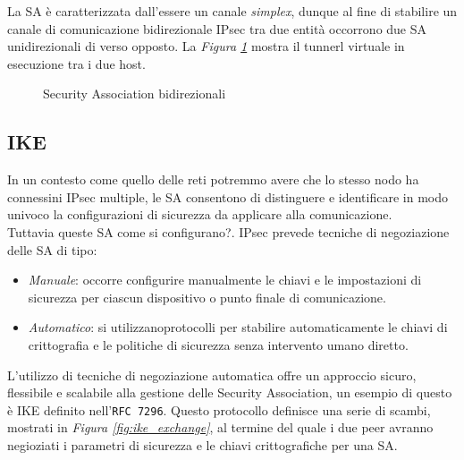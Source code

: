 \noindent
La SA è caratterizzata dall'essere un canale \textit{simplex}, dunque al fine di stabilire un canale di comunicazione bidirezionale IPsec tra due entità occorrono due SA unidirezionali di verso opposto.
La \textit{Figura \ref{fig:sa_bidirezionale}} mostra il tunnerl virtuale in esecuzione tra i due host.
\begin{figure}[h!]
    \centering
    \vspace{0.4cm}
    \caption{Security Association bidirezionali}
    \label{fig:sa_bidirezionale}
\end{figure}

\noindent

\subsection{IKE}

In un contesto come quello delle reti potremmo avere che lo stesso nodo ha connessini IPsec multiple, 
le SA consentono di distinguere e identificare in modo univoco la configurazioni di sicurezza da applicare alla comunicazione.\\
Tuttavia queste SA come si configurano?.
IPsec prevede tecniche di negoziazione delle SA di tipo:

\begin{itemize}
    \item \textit{Manuale}: occorre configurire manualmente le chiavi e le
    impostazioni di sicurezza per ciascun dispositivo o punto finale di
    comunicazione.
    \item \textit{Automatico}: si utilizzanoprotocolli per stabilire
    automaticamente le chiavi di crittografia e le politiche di sicurezza senza
    intervento umano diretto.
\end{itemize}
\noindent
L'utilizzo di tecniche di negoziazione automatica offre un approccio sicuro, flessibile e scalabile alla gestione delle Security Association, un esempio di questo è IKE definito nell'\texttt{RFC 7296}.
Questo protocollo definisce una serie di scambi, mostrati in \textit{Figura \ref{fig:ike_exchange}}, al termine del quale i due peer avranno negioziati i parametri di sicurezza e le chiavi crittografiche per una SA.


